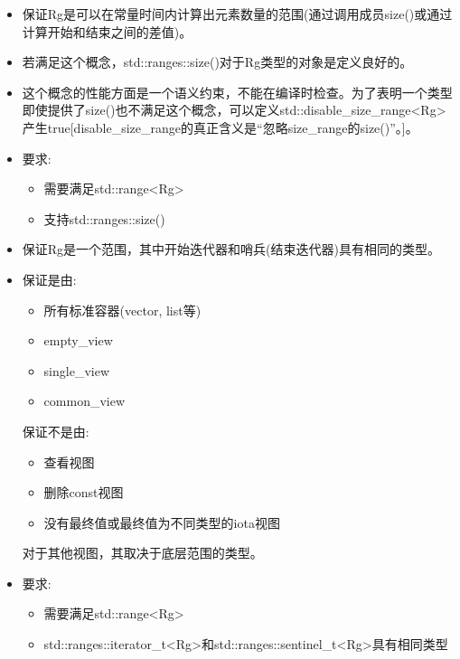 \begin{itemize}
\item
保证Rg是可以在常量时间内计算出元素数量的范围(通过调用成员size()或通过计算开始和结束之间的差值)。

\item
若满足这个概念，std::ranges::size()对于Rg类型的对象是定义良好的。

\item
这个概念的性能方面是一个语义约束，不能在编译时检查。为了表明一个类型即使提供了size()也不满足这个概念，可以定义std::disable\_size\_range<Rg>产生true[disable\_size\_range的真正含义是“忽略size\_range的size()”。]。

\item
要求:

\begin{itemize}
\item
需要满足std::range<Rg>

\item
支持std::ranges::size()
\end{itemize}
\end{itemize}


\begin{itemize}
\item
保证Rg是一个范围，其中开始迭代器和哨兵(结束迭代器)具有相同的类型。

\item
保证是由:

\begin{itemize}
\item
所有标准容器(vector, list等)

\item
empty\_view

\item
single\_view

\item
common\_view
\end{itemize}

保证不是由:

\begin{itemize}
\item
查看视图

\item
删除const视图

\item
没有最终值或最终值为不同类型的iota视图
\end{itemize}

对于其他视图，其取决于底层范围的类型。

\item
要求:

\begin{itemize}
\item
需要满足std::range<Rg>

\item
std::ranges::iterator\_t<Rg>和std::ranges::sentinel\_t<Rg>具有相同类型
\end{itemize}
\end{itemize}

